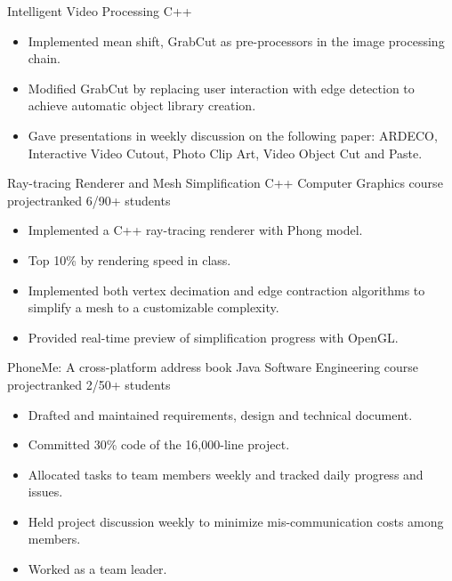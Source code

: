 \documentclass[10pt,a4paper]{moderncv/moderncv}
\begin{document}

{Intelligent Video Processing}
{C++}
{}{}
{
\begin{itemize}
	\item Implemented mean shift, GrabCut as pre-processors in the image processing chain.
	\item Modified GrabCut by replacing user interaction with edge detection to achieve automatic object library creation.
	\item Gave presentations in weekly discussion on the following paper: ARDECO, Interactive Video Cutout, Photo Clip Art, Video Object Cut and Paste.
\end{itemize}
}

{Ray-tracing Renderer and Mesh Simplification}
{C++}
{Computer Graphics course project}{ranked 6/90+ students}
{{
\begin{itemize}
	\item Implemented a C++ ray-tracing renderer with Phong model.
	\item Top 10\% by rendering speed in class.
	\item Implemented both vertex decimation and edge contraction algorithms to simplify a mesh to a customizable complexity.
	\item Provided real-time preview of simplification progress with OpenGL.
\end{itemize}}
}

{PhoneMe: A cross-platform address book}
{Java}
{Software Engineering course project}{ranked 2/50+ students}
{
\begin{itemize}
	\item Drafted and maintained requirements, design and technical document.
	\item Committed 30\% code of the 16,000-line project.
	\item Allocated tasks to team members weekly and tracked daily progress and issues.
	\item Held project discussion weekly to minimize mis-communication costs among members.
	\item Worked as a team leader.
\end{itemize}
}
\end{document}
